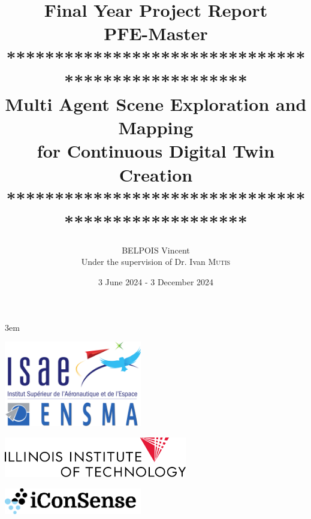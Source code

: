 \documentclass[12pt]{article}
\title{Final Year Project Report\vspace{10pt}\\
PFE-Master\vspace{10pt}\\
**************************************************\\
Multi Agent Scene Exploration and Mapping \\
for Continuous Digital Twin Creation\vspace{10pt}\\
**************************************************}
\author{BELPOIS Vincent \\ Under the supervision of Dr. Ivan \textsc{Mutis}}
\begin{document}
\emergencystretch 3em
\date{3 June 2024 - 3 December 2024}
\maketitle
\thispagestyle{empty}

\vspace{10mm}

\begin{center}
\includegraphics[width = 6cm]{Images/logo_ensma.png}
\end{center}
\vspace{2cm}
\begin{center}
    \includegraphics[width = 8cm]{Images/IIT_Logo_stack_186_blk.png}
\end{center}
\vspace{1cm}
\begin{center}
    \includegraphics[width = 6cm]{Images/logo_iconsense_bloack_text.png}
\end{center}
\newpage
\thispagestyle{empty}
\mbox{}




\end{document}
